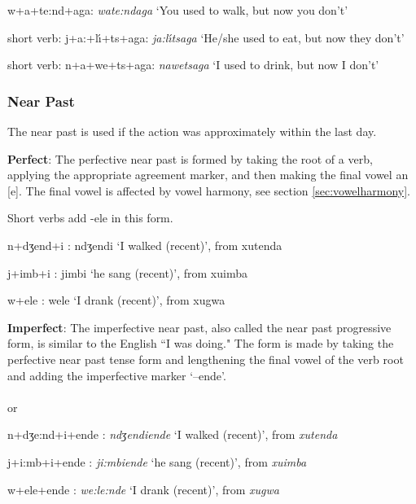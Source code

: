 \begin{wrdex}
\item w+a+t\esh{}e:nd+a\engma{}ga: \emph{wat\esh{}e:nda\engma{}ga} `You used to walk, but now you don't'
\item  short verb: j+a:+l\'{\i}+ts+a\engma{}ga: \emph{ja:l\'{\i}tsa\engma{}ga} `He/she used to eat, but now they don't'
\item short verb: n+a+\engma{}we+ts+a\engma{}ga: \emph{na\engma{}wetsa\engma{}ga} `I used to drink, but now I don't'
\end{wrdex}

\subsubsection{Near Past}
The near past is used if the action was approximately within the last day.

\textbf{Perfect}: The perfective near past is formed by taking the root of a verb, applying the appropriate agreement marker, and then making the final vowel an [e].  The final vowel is affected by vowel harmony, see section \ref{sec:vowelharmony}.\\

Short verbs add -ele in this form.\\

\begin{wrdex}
\item n+dʒend+i : ndʒendi `I walked (recent)', from xut\esh{}enda
\item j+imb+i : jimbi `he sang (recent)', from xuimba
\item \engma{}w+ele : \engma{}wele `I drank (recent)', from xu\engma{}gwa
\end{wrdex}

\textbf{Imperfect}: The imperfective near past, also called the near past progressive form, is similar to the English ``I was doing."  The form is made by taking the perfective near past tense form and lengthening the final vowel of the verb root and adding the imperfective marker `--end\ezh{}e'.\\
\\
or\\

\begin{wrdex}
\item n+dʒe:nd+i+end\ezh{}e : \emph{ndʒendiend\ezh{}e} `I walked (recent)', from \emph{xut\esh{}enda}
\item j+i:mb+i+end\ezh{}e : \emph{ji:mbiend\ezh{}e} `he sang (recent)', from \emph{xuimba}
\item \engma{}w+ele+end\ezh{}e : \emph{\engma{}we:le:nd\ezh{}e} `I drank (recent)', from \emph{xu\engma{}gwa}
\end{wrdex}

